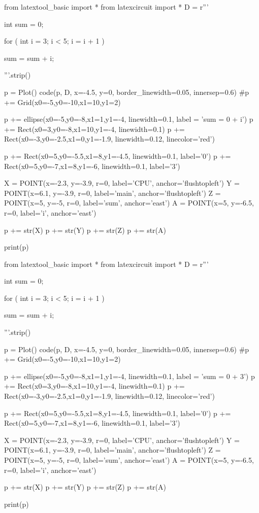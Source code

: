 \begin{python}
from latextool_basic import *
from latexcircuit import *
D = r'''



int sum = 0;

    for ( int i = 3;     i < 5;     i = i + 1 )


        sum = sum + i;



'''.strip()

p = Plot()
code(p, D, x=-4.5, y=0, border_linewidth=0.05, innersep=0.6)
#p += Grid(x0=-5,y0=-10,x1=10,y1=2)

p += ellipse(x0=-5,y0=-8,x1=1,y1=-4, linewidth=0.1, label = 'sum = 0 + i')
p += Rect(x0=3,y0=-8,x1=10,y1=-4, linewidth=0.1)
p += Rect(x0=-3,y0=-2.5,x1=0,y1=-1.9, linewidth=0.12, linecolor='red')

p += Rect(x0=5,y0=-5.5,x1=8,y1=-4.5, linewidth=0.1, label='0')
p += Rect(x0=5,y0=-7,x1=8,y1=-6, linewidth=0.1, label='3')

X = POINT(x=-2.3, y=-3.9, r=0, label='CPU', anchor='flushtopleft')
Y = POINT(x=6.1, y=-3.9, r=0, label='main', anchor='flushtopleft')
Z = POINT(x=5, y=-5, r=0, label='sum', anchor='east')
A = POINT(x=5, y=-6.5, r=0, label='i', anchor='east')

p += str(X)
p += str(Y)
p += str(Z)
p += str(A)

print(p)
\end{python}

\begin{python}
from latextool_basic import *
from latexcircuit import *
D = r'''



int sum = 0;

    for ( int i = 3;     i < 5;     i = i + 1 )


        sum = sum + i;



'''.strip()

p = Plot()
code(p, D, x=-4.5, y=0, border_linewidth=0.05, innersep=0.6)
#p += Grid(x0=-5,y0=-10,x1=10,y1=2)

p += ellipse(x0=-5,y0=-8,x1=1,y1=-4, linewidth=0.1, label = 'sum = 0 + 3')
p += Rect(x0=3,y0=-8,x1=10,y1=-4, linewidth=0.1)
p += Rect(x0=-3,y0=-2.5,x1=0,y1=-1.9, linewidth=0.12, linecolor='red')

p += Rect(x0=5,y0=-5.5,x1=8,y1=-4.5, linewidth=0.1, label='0')
p += Rect(x0=5,y0=-7,x1=8,y1=-6, linewidth=0.1, label='3')

X = POINT(x=-2.3, y=-3.9, r=0, label='CPU', anchor='flushtopleft')
Y = POINT(x=6.1, y=-3.9, r=0, label='main', anchor='flushtopleft')
Z = POINT(x=5, y=-5, r=0, label='sum', anchor='east')
A = POINT(x=5, y=-6.5, r=0, label='i', anchor='east')

p += str(X)
p += str(Y)
p += str(Z)
p += str(A)

print(p)
\end{python}

